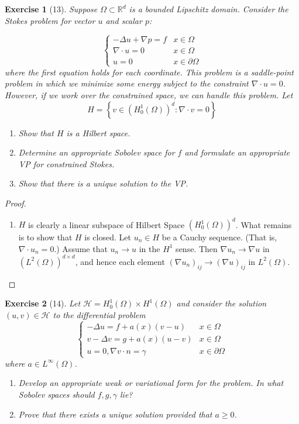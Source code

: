 \documentclass[letterpaper,twoside,11pt]{article}
\theoremstyle{mystyle}
\newtheorem*{exercise}{Exercise}
\newcommand{\R}{{\mathbb R}}
\begin{document}
\begin{exercise}[13]
Suppose $\Omega\subset \R^d$ is a bounded Lipschitz domain. Consider the Stokes problem for vector $u$ and scalar $p$: 

\[\left\{ 
\begin{array}{*{20}{rl}}
- \Delta u + \nabla p = f  & x \in \Omega \\[.2cm] 
\nabla \cdot u = 0 & x \in \Omega \\[.2cm] 
u = 0 & x \in \partial \Omega  
\end{array}
\right. \]
where the first equation holds for each coordinate. This problem is a saddle-point problem in which we minimize some energy subject to the constraint $\nabla \cdot u = 0$. However, if we work over the constrained space, we can handle this problem. Let 
\[H = \left\{ v \in \left( H_0^1 (\Omega) \right)^d  : \nabla \cdot v = 0\right\}\]
\begin{enumerate}
  \item Show that $H$ is a Hilbert space. 
  \item Determine an appropriate Sobolev space for $f$ and formulate an appropriate VP for constrained Stokes. 
  \item Show that there is a unique solution to the VP. 
\end{enumerate}
\end{exercise}

\begin{proof}
  \begin{enumerate}
    \item $H$ is clearly a linear subspace of Hilbert Space $\left( H_0^1 (\Omega) \right)^d$. What remains is to show that $H$ is closed. Let $u_n \in H$ be a Cauchy sequence. (That is, $\nabla \cdot u_n = 0$.) Assume that $u_n \to u $ in the $H^1$ sense. Then $\nabla u_n \to \nabla u$ in $(L^2(\Omega))^{d\times d}$, and hence each element $\left( \nabla u_n \right)_{ij} \to \left( \nabla u \right)_{ij}$ in $L^2\left( \Omega \right)$. 
  \end{enumerate}
\end{proof}


\begin{exercise}[14]
Let $\mathcal H = H_0^1 \left( \Omega \right) \times H^1 \left( \Omega \right)$ and consider the solution $\left( u,v \right)\in \mathcal H$ to the differential problem  
\[\left\{ {\begin{array}{*{20}{c}}
  - \Delta u = f + a(x)\left( v-u \right) & x \in \Omega \\[.2cm] 
  v - \Delta v = g + a(x)(u-v) & x \in \Omega \\[.2cm] 
  u = 0, \nabla v \cdot n = \gamma & x \in \partial \Omega
\end{array}} \right.\]
where $a \in L^\infty \left( \Omega \right)$. 
\begin{enumerate}
  \item Develop an appropriate weak or variational form for the problem. In what Sobolev spaces should $f, g, \gamma$ lie? 
  \item Prove that there exists a unique solution provided that $a \geq 0$. 
\end{enumerate}
\end{exercise}
\end{document}
